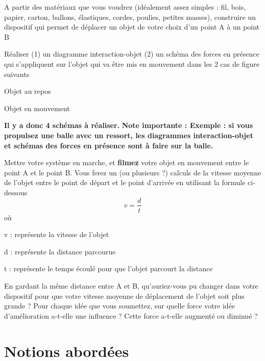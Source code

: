 \documentclass[a4paper,12pt]{article}
\begin{document}
\begin{compactenum}
\item A partir des matériaux que vous voudrez (idéalement assez simples : fil, bois, papier, carton, ballons, élastiques, cordes, poulies, petites masses), construire un dispositif qui permet de déplacer un objet de votre choix d'un point A à un point B
\item Réaliser (1) un diagramme interaction-objet (2) un schéma des forces en présence qui s'appliquent sur l'objet qui va être mis en mouvement dans les 2 cas de figure suivants 
  \begin{compactitem}
    \item Objet au repos
    \item Objet en mouvement
  \end{compactitem}
  \textbf{Il y a donc 4 schémas à réaliser.} 
  \textbf{Note importante : Exemple : si vous propulsez une balle avec un ressort, les diagrammes interaction-objet et schémas des forces en présence sont à faire sur la balle.}
\item Mettre votre système en marche, et \textbf{filmez} votre objet en mouvement entre le point A et le point B. Vous ferez un (ou plusieurs ?) calculs de la vitesse moyenne de l'objet entre le point de départ et le point d'arrivée en utilisant la formule ci-dessous 
\[
  v = \frac{d}{t}
  \]
  où 

  \begin{addmargin}[4em]{1em}
    \begin{compactitem}
        \item [v]: représente la vitesse de l'objet
        \item [d]: représente la distance parcourue
        \item [t]: représente le temps écoulé pour que l'objet parcourt la distance
    \end{compactitem}
    \end{addmargin}
    \item En gardant la même distance entre A et B, qu'auriez-vous pu changer dans votre dispositif pour que votre vitesse moyenne de déplacement de l'objet soit plus grande ? Pour chaque idée que vous soumettez, sur quelle force votre idée d'amélioration a-t-elle une influence ? Cette force a-t-elle augmenté ou diminué ?
  \end{compactenum}

\section*{Notions abordées}
\end{document}
